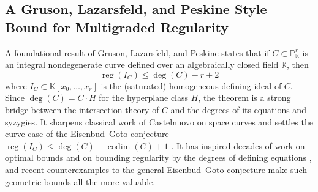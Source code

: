 \documentclass[11pt,reqno]{amsart}
\newtheorem{cor}[lemma]{Corollary}
\theoremstyle{remark}
\newcommand{\reg}{\operatorname{reg}}
\newcommand{\codim}{\operatorname{codim}}
\newcommand{\KK}{\mathbb{K}}
\newcommand{\NN}{\mathbb{N}}
\newcommand{\PP}{\mathbb{P}}
\begin{document}
%
%
%
 \subsection{A Gruson, Lazarsfeld, and Peskine Style Bound for Multigraded Regularity}
 A foundational result of Gruson, Lazarsfeld, and Peskine \cite{GLP83} states that if $C \subset \PP^r_{\KK}$ is an integral nondegenerate curve defined over an algebraically closed field $\KK$, then
\[
\reg\left(I_{C}\right) \leq \deg(C)-r+2
\]
where $I_{C} \subset \KK[x_0,\ldots,x_r]$ is the (saturated) homogeneous defining ideal of $C$. Since $\deg(C) = C \cdot H$ for the hyperplane class $H$, the theorem is a strong bridge between the intersection theory of $C$ and the degrees of its equations and syzygies. It sharpens classical work of Castelnuovo \cite{castelnuovo1893} on space curves and settles the curve case of the Eisenbud--Goto conjecture $\reg(I_C) \leq \deg(C) - \codim(C) + 1$ \cite{eisenbudGoto84}. It has inspired decades of work on optimal bounds \cite{pinkham86,lazarsfeld87,kwak98,kwak00} and on bounding regularity by the degrees of defining equations \cite{BEL91,einLazarsfeld93,CEL01}, and recent counterexamples to the general Eisenbud--Goto conjecture \cite{MP18,CCMPV19,McCulloughPeeva20} make such geometric bounds all the more valuable.  
\end{document}
